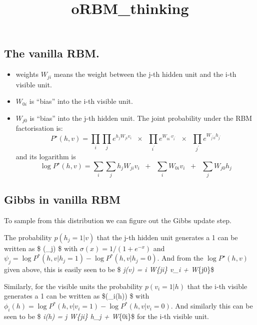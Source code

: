 \documentclass{article}
\title{oRBM\_thinking}
\begin{document}
    
    
    \maketitle
    
    

    
    \subsection{The vanilla RBM.}\label{the-vanilla-rbm.}

\begin{itemize}
\itemsep1pt\parskip0pt
\item
  weights \(W_{ji}\) means the weight between the j-th hidden unit and
  the i-th visible unit.
\item
  \(W_{0i}\) is ``bias'' into the i-th visible unit.
\item
  \(W_{j0}\) is ``bias'' into the j-th hidden unit. The joint
  probability under the RBM factorisation is:
  \[ P^\star(h,v) = \prod_i \prod_j e^{h_j W_{ji} v_i} \;\; \times \;\; \prod_{i^\prime} e^{W_{0i^\prime} v_{i^\prime}} \;\; \times \;\; \prod_{j^\prime} e^{W_{j^\prime 0} h_{j^\prime}} \]
  and its logarithm is
  \[ \log P^\star(h,v) = \sum_i  \sum_j h_j W_{ji} v_i \;\; + \;\; \sum_i W_{0i} v_i \;\; + \;\; \sum_j W_{j0} h_j \]
\end{itemize}

    \subsection{Gibbs in vanilla RBM}\label{gibbs-in-vanilla-rbm}

To sample from this distribution we can figure out the Gibbs update
step.

The probability \(p(h_j=1|v)\) that the j-th hidden unit generates a 1
can be written as \$ \sigma(\psi_j) \$ with \( \sigma(x)=1/(1+e^{-x})\)
and \(\psi_j = \log P^*(h,v | h_j =1 ) - \log P^*(h,v | h_j = 0)\). And
from the \(\log P^\star(h,v)\) given above, this is easily seen to be \$
\psi\emph{j(v) = \sum\emph{i W}\{ji\} v\_i + W}\{j0\}\$

Similarly, for the visible units the probability \(p(v_i=1|h)\) that the
i-th visible generates a 1 can be written as \$\sigma(\phi\_i(h)) \$
with \(\phi_i(h) = \log P^*(h,v | v_i =1 ) - \log P^*(h,v | v_i = 0)\).
And similarly this can be seen to be \$ \phi\emph{i(h) = \sum\emph{j
W}\{ji\} h\_j + W}\{0i\}\$ for the i-th visible unit.
\end{document}
